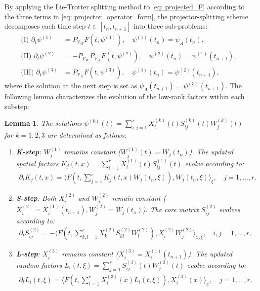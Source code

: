 \documentclass[preprint,11pt]{elsarticle}
\newtheorem{lemma}{Lemma}[section]
\begin{document}
By applying the Lie-Trotter splitting method to \eqref{eq: projected_F} according to the three terms in \eqref{eq: projector_operator_form}, the projector-splitting scheme decomposes each time step $t \in [t_n, t_{n+1}]$ into three sub-problems:
\begin{align*}
    \text{(I) } \partial_t \psi^{(1)} &= P_{\mathcal{V}_W} F(t, \psi^{(1)}), \quad \psi^{(1)}(t_n) = \psi_A(t_n), \\
    \text{(II) } \partial_t \psi^{(2)} &= -P_{\mathcal{V}_W} P_{\mathcal{V}_X} F(t, \psi^{(2)}), \quad \psi^{(2)}(t_n) = \psi^{(1)}(t_{n+1}), \\
    \text{(III) } \partial_t \psi^{(3)} &= P_{\mathcal{V}_X} F(t, \psi^{(3)}), \quad \psi^{(3)}(t_n) = \psi^{(2)}(t_{n+1}),
\end{align*}
where the solution at the next step is set as $\psi_A(t_{n+1}) = \psi^{(3)}(t_{n+1})$. The following lemma characterizes the evolution of the low-rank factors within each substep:
\begin{lemma}
    The solutions $\psi^{(k)}(t) = \sum_{i,j=1}^r X_i^{(k)}(t) S_{ij}^{(k)}(t) W_j^{(k)}(t)$ for $k=1,2,3$ are determined as follows:
    \begin{enumerate}
        \item \textbf{K-step}: $W_j^{(1)}$ remains constant ($W_j^{(1)}(t) = W_j(t_n)$). The updated spatial factors $K_j(t, x) = \sum_{i=1}^r X_i^{(1)}(t) S_{ij}^{(1)}(t)$ evolve according to:
        \begin{align*}
            \partial_t K_j(t, x) = \langle F(t, \sum_{j=1}^r K_j(t, x) W_j(t_n, \xi)), W_j(t_n, \xi) \rangle_{\xi}, \quad j=1,\dots,r.
        \end{align*}
        \item \textbf{S-step}: Both $X_i^{(2)}$ and $W_j^{(2)}$ remain constant ($X_i^{(2)} = X_i^{(1)}(t_{n+1}), W_j^{(2)} = W_j(t_n)$). The core matrix $S_{ij}^{(2)}$ evolves according to:
        \begin{align*}
            \partial_t S_{ij}^{(2)} = -\langle F(t, \sum_{k,l=1}^r X_k^{(2)} S_{kl}^{(2)} W_l^{(2)}), X_i^{(2)} W_j^{(2)} \rangle_{x,\xi}, \quad i,j=1,\dots,r.
        \end{align*}
        \item \textbf{L-step}: $X_i^{(3)}$ remains constant ($X_i^{(3)} = X_i^{(1)}(t_{n+1})$). The updated random factors $L_i(t, \xi) = \sum_{j=1}^r S_{ij}^{(3)}(t) W_j^{(3)}(t)$ evolve according to:
        \begin{align*}
            \partial_t L_i(t, \xi) = \langle F(t, \sum_{i=1}^r X_i^{(3)}(x) L_i(t, \xi)), X_i^{(3)}(x) \rangle_{x}, \quad j=1,\dots,r.
        \end{align*}
    \end{enumerate}
\end{lemma}
\end{document}

